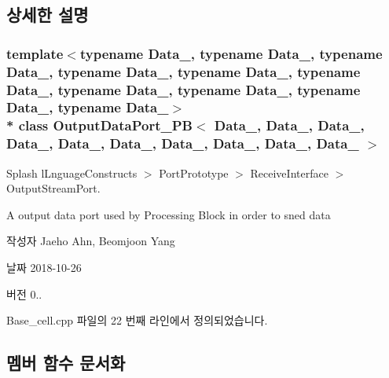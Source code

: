 \subsection{상세한 설명}
\subsubsection*{template$<$typename Data\+\_, typename Data\+\_, typename Data\+\_, typename Data\+\_, typename Data\+\_, typename Data\+\_, typename Data\+\_, typename Data\+\_, typename Data\+\_, typename Data\+\_$>$\\*
class Output\+Data\+Port\+\_\+\+P\+B$<$ Data\+\_, Data\+\_, Data\+\_, Data\+\_, Data\+\_, Data\+\_, Data\+\_, Data\+\_, Data\+\_, Data\+\_ $>$}

Splash l\+Lnguage\+Constructs $>$ Port\+Prototype $>$ Receive\+Interface $>$ Output\+Stream\+Port. 

A output data port used by Processing Block in order to sned data \begin{DoxyAuthor}{작성자}
Jaeho Ahn, Beomjoon Yang 
\end{DoxyAuthor}
\begin{DoxyDate}{날짜}
2018-\/10-\/26 
\end{DoxyDate}
\begin{DoxyVersion}{버전}
0.. 
\end{DoxyVersion}


Base\+\_\+cell.\+cpp 파일의 22 번째 라인에서 정의되었습니다.



\subsection{멤버 함수 문서화}
